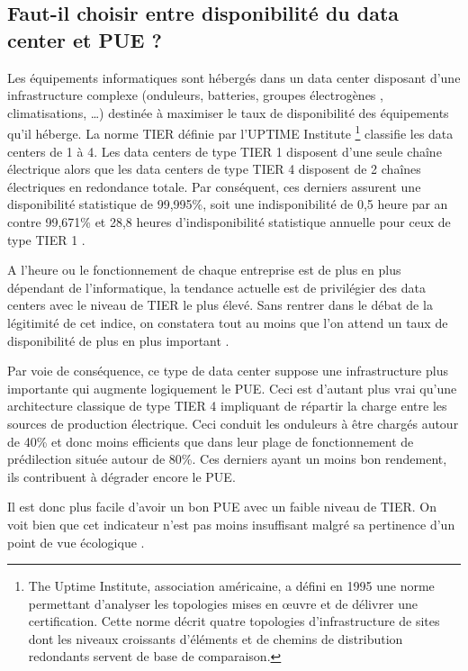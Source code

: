 \subsection{Faut-il choisir entre disponibilité du data center et PUE ?}
\begin{onehalfspace}
Les équipements informatiques sont hébergés dans un data center disposant d’une infrastructure complexe (onduleurs, batteries, groupes électrogènes , climatisations, …) destinée à maximiser le taux de disponibilité des équipements qu’il héberge. La norme TIER définie par l’UPTIME Institute \footnote{The Uptime Institute, association américaine, a défini en 1995 une norme permettant d’analyser les topologies mises en œuvre et de délivrer une certification. Cette norme décrit quatre topologies d’infrastructure de sites dont les niveaux croissants d’éléments et de chemins de distribution redondants servent de base de comparaison.} classifie les data centers de 1 à 4. Les data centers de type TIER 1 disposent d’une seule chaîne électrique alors que les data centers de type TIER 4 disposent de 2 chaînes électriques en redondance totale. Par conséquent,  ces derniers assurent une disponibilité statistique de 99,995\%, soit une indisponibilité de 0,5 heure par an contre 99,671\% et 28,8 heures d’indisponibilité statistique annuelle pour ceux de type TIER 1 \cite{WEB7}.\medskip

A l'heure ou le fonctionnement de chaque entreprise est de plus en plus dépendant de l'informatique, la tendance actuelle est de privilégier des data centers avec le niveau de TIER le plus élevé. Sans rentrer dans le débat de la légitimité de cet indice, on constatera tout au moins que l'on attend un taux de disponibilité de plus en plus important \cite{WEB7}.\medskip 

Par voie de conséquence, ce type de data center suppose une infrastructure plus importante qui augmente logiquement le PUE. Ceci est d'autant plus vrai qu'une architecture classique de type TIER 4 impliquant de répartir la charge entre les sources de production électrique. Ceci conduit les onduleurs à être chargés autour de 40\% et donc moins efficients que dans leur plage de fonctionnement de prédilection située autour de 80\%. Ces derniers ayant un moins bon rendement, ils contribuent à dégrader encore le PUE.\medskip 

Il est donc plus facile d’avoir un bon PUE avec un faible niveau de TIER. On voit  bien que cet indicateur n’est pas moins insuffisant  malgré sa pertinence d'un point de vue écologique \cite{WEB7}.
\end{onehalfspace}
